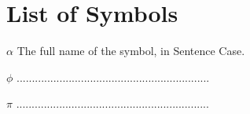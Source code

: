 \chapter*{List of Symbols}

\begin{leftitemize}
    \item[$\alpha$] The full name of the symbol, in Sentence Case.
    \item[$\phi$] ...............................................................
    \item[$\pi$] ...............................................................
\end{leftitemize}

\clearpage
